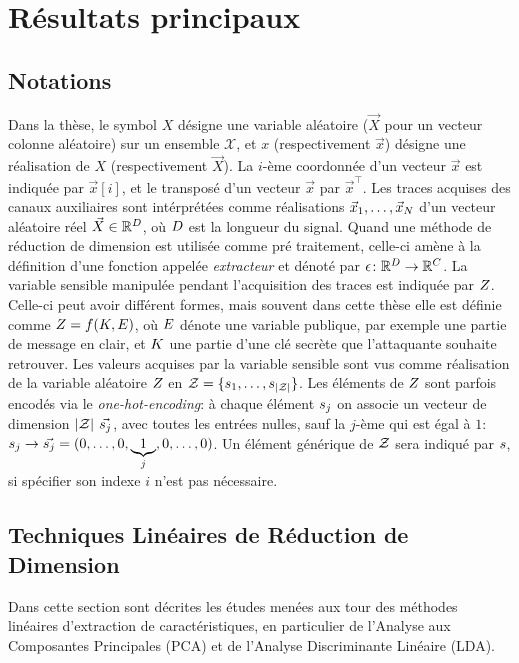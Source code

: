 \section{Résultats principaux}\label{sec:res}

\subsection{Notations}
Dans la thèse, le symbol $X$ désigne une variable aléatoire ($\vec{X}$ pour un vecteur colonne aléatoire) sur un ensemble $\mathcal{X}$, et $x$ (respectivement $\vec{x}$) désigne une réalisation de $X$ (respectivement $\vec{X}$). 
La $i$-ème coordonnée d'un vecteur $\vec{x}$ est indiquée par $\vec{x}[i]$, et le transposé d'un vecteur $\vec{x}$ par $\vec{x}^\intercal$. Les traces acquises des canaux auxiliaires sont intérprétées comme réalisations $\vec{x}_1, \dots , \vec{x}_N$ d'un vecteur aléatoire réel $\vec{X}\in\mathbb{R}^D$, où $D$ est la longueur du signal. Quand une méthode de réduction de dimension est utilisée comme pré traitement, celle-ci amène à la définition d'une fonction appelée \emph{extracteur} et dénoté par $\epsilon \colon \mathbb{R}^D \rightarrow \mathbb{R}^C$. La variable sensible manipulée pendant l'acquisition des traces est indiquée par $Z$. Celle-ci peut avoir différent formes, mais souvent dans cette thèse elle est définie comme $Z = f(K,E)$, où $E$ dénote une variable publique, par exemple une partie de message en clair, et $K$ une partie d'une clé secrète que l'attaquante souhaite retrouver. Les valeurs acquises par la variable sensible sont vus comme réalisation de la variable aléatoire $Z$ en $\mathcal{Z} = \{s_{1}, \dots, s_{\lvert\mathcal{Z}\rvert}\}$. Les éléments de $Z$ sont parfois encodés via le \emph{one-hot-encoding}: à chaque élément $s_{j}$ on associe un vecteur de dimension $\lvert\mathcal{Z}\rvert$ $\vec{s_{j}}$, avec toutes les entrées nulles, sauf la $j$-ème qui est égal à  $1$: $s_{j}
\rightarrow \vec{s_{j}} = (0,\ldots , 0,\underbrace{1}_{j},0,\dots,0)$. Un élément générique de $\mathcal{Z}$ sera indiqué par $s$, si spécifier son indexe  $i$ n'est pas nécessaire.

\subsection{Techniques Linéaires de Réduction de Dimension}\label{sec:lin}
Dans cette section sont décrites les études menées aux tour des méthodes linéaires d'extraction de caractéristiques, en particulier de l'Analyse aux Composantes Principales (PCA) et de l'Analyse Discriminante Linéaire (LDA). 
